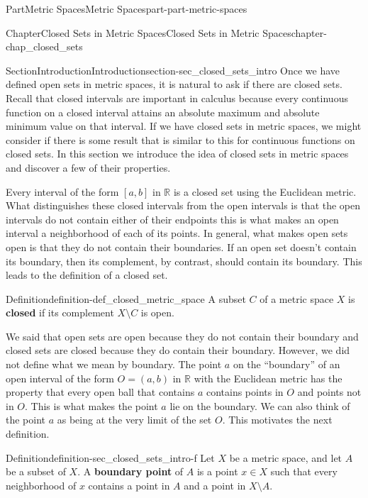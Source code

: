 \documentclass[oneside,10pt,]{book}
\newcommand{\terminology}[1]{\textbf{#1}}
\numberwithin{equation}{chapter}
\newcommand{\R}{\mathbb{R}}
\begin{document}
\begin{partptx}{Part}{Metric Spaces}{}{Metric Spaces}{}{}{part-part-metric-spaces}
\begin{chapterptx}{Chapter}{Closed Sets in Metric Spaces}{}{Closed Sets in Metric Spaces}{}{}{chapter-chap_closed_sets}
%
%
\typeout{************************************************}
\typeout{************************************************}
%
\begin{sectionptx}{Section}{Introduction}{}{Introduction}{}{}{section-sec_closed_sets_intro}
Once we have defined open sets in metric spaces, it is natural to ask if there are closed sets. Recall that closed intervals are important in calculus because every continuous function on a closed interval attains an absolute maximum and absolute minimum value on that interval. If we have closed sets in metric spaces, we might consider if there is some result that is similar to this for continuous functions on closed sets. In this section we introduce the idea of closed sets in metric spaces and discover a few of their properties.%
\par
Every interval of the form \([a,b]\) in \(\R\) is a closed set using the Euclidean metric. What distinguishes these closed intervals from the open intervals is that the open intervals do not contain either of their endpoints \textemdash{} this is what makes an open interval a neighborhood of each of its points. In general, what makes open sets open is that they do not contain their boundaries. If an open set doesn't contain its boundary, then its complement, by contrast, should contain its boundary. This leads to the definition of a closed set.%
\begin{definition}{Definition}{}{definition-def_closed_metric_space}%
%
A subset \(C\) of a metric space \(X\) is \terminology{closed} if its complement \(X \setminus C\) is open.%
\end{definition}
We said that open sets are open because they do not contain their boundary and closed sets are closed because they do contain their boundary. However, we did not define what we mean by boundary. The point \(a\) on the ``boundary'' of an open interval of the form \(O=(a,b)\) in \(\R\) with the Euclidean metric has the property that every open ball that contains \(a\) contains points in \(O\) and points not in \(O\). This is what makes the point \(a\) lie on the boundary. We can also think of the point \(a\) as being at the very limit of the set \(O\). This motivates the next definition.%
\begin{definition}{Definition}{}{definition-sec_closed_sets_intro-f}%
%
Let \(X\) be a metric space, and let \(A\) be a subset of \(X\). A \terminology{boundary point} of \(A\) is a point \(x \in X\) such that every neighborhood of \(x\) contains a point in \(A\) and a point in \(X \setminus A\).%

\end{definition}
\end{sectionptx}
\end{chapterptx}
\end{partptx}
\end{document}

